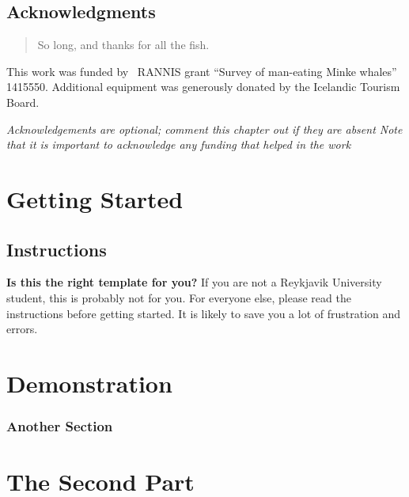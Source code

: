 \documentclass[showtrims, b5paper]{rubook}
\begin{document}
\chapter*{Acknowledgments} 
\begin{quotation}
So long, and thanks for all the fish.
\end{quotation}
\vspace{\baselineskip}

This work was funded by \the\year~RANNIS grant ``Survey of man-eating Minke whales'' 1415550.
Additional equipment was generously donated by the Icelandic Tourism Board.

{\em Acknowledgements are optional; comment this chapter out if they are absent
  Note that it is important to acknowledge any funding that helped in the work\/}
\clearpage{}

\mainmatter{}

\part{Getting Started} %
\chapter{Instructions}
\textbf{Is this the right template for you?}
If you are not a Reykjavik University student, this is probably not for you.
For everyone else, please read the instructions before getting started.
It is likely to save you a lot of frustration and errors.
\part{Demonstration}
\section{Another Section}
\part{The Second Part} %

\printbibliography{}

\appendix{}%


\clearforchapter{}
\printindex{}%
\end{document}
